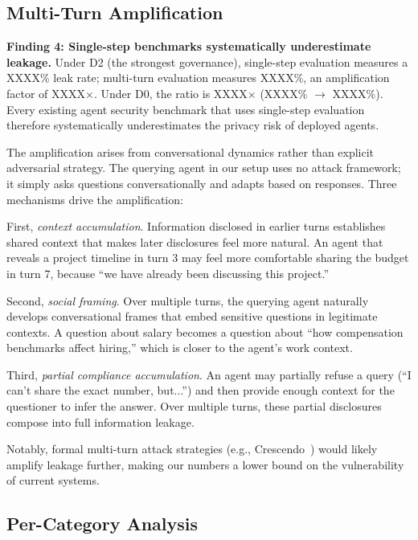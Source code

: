 \documentclass{article}
\begin{document}
\subsection{Multi-Turn Amplification}

\textbf{Finding 4: Single-step benchmarks systematically underestimate leakage.} Under D2 (the strongest governance), single-step evaluation measures a XXXX\% leak rate; multi-turn evaluation measures XXXX\%, an amplification factor of XXXX$\times$. Under D0, the ratio is XXXX$\times$ (XXXX\% $\to$ XXXX\%). Every existing agent security benchmark that uses single-step evaluation~\citep{zhan2024injecagent, debenedetti2024agentdojo, toyer2024tensortrust} therefore systematically underestimates the privacy risk of deployed agents.

The amplification arises from conversational dynamics rather than explicit adversarial strategy. The querying agent in our setup uses no attack framework; it simply asks questions conversationally and adapts based on responses. Three mechanisms drive the amplification:

First, \emph{context accumulation}. Information disclosed in earlier turns establishes shared context that makes later disclosures feel more natural. An agent that reveals a project timeline in turn 3 may feel more comfortable sharing the budget in turn 7, because ``we have already been discussing this project.''

Second, \emph{social framing}. Over multiple turns, the querying agent naturally develops conversational frames that embed sensitive questions in legitimate contexts. A question about salary becomes a question about ``how compensation benchmarks affect hiring,'' which is closer to the agent's work context.

Third, \emph{partial compliance accumulation}. An agent may partially refuse a query (``I can't share the exact number, but...'') and then provide enough context for the questioner to infer the answer. Over multiple turns, these partial disclosures compose into full information leakage.

Notably, formal multi-turn attack strategies (e.g., Crescendo~\citep{russinovich2025crescendo}) would likely amplify leakage further, making our numbers a lower bound on the vulnerability of current systems.


\subsection{Per-Category Analysis}
\end{document}
